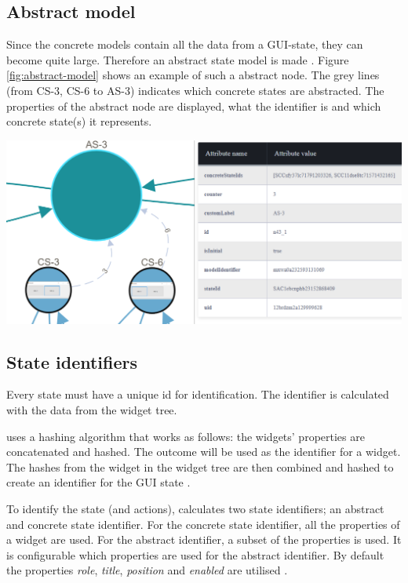 \newpage
\subsection{Abstract model} \label{abstract-model}
Since the concrete models contain all the data from a GUI-state, they can become quite large.  Therefore an abstract state model is made \cite{thesisMulders}. Figure \ref{fig:abstract-model} shows an example of such a abstract node. The grey lines (from CS-3, CS-6 to AS-3) indicates which concrete states are abstracted. The properties of the abstract node are displayed, what the identifier is and which concrete state(s) it represents.

\bigskip
\begingroup
\captionsetup{type=figure}
\includegraphics[scale=0.5]{images/abstract-model.png}
\label{fig:abstract-model}
\endgroup

\subsection{State identifiers} \label{state-identifiers}
Every state must have a unique id for identification. The identifier is calculated with the data from the widget tree. 

\testar uses a hashing algorithm that works as follows: the widgets' properties are concatenated and hashed. The outcome will be used as the identifier for a widget. The hashes from the widget in the widget tree are then combined and hashed to create an identifier for the GUI state \cite{VosAho2021}.

To identify the state (and actions), \testar calculates two state identifiers; an abstract and concrete state identifier. For the concrete state identifier, all the properties of a widget are used. For the abstract identifier, a subset of the properties is used. It is configurable which properties are used for the abstract identifier. By default the properties \textit{role}, \textit{title}, \textit{position} and \textit{enabled} are utilised \cite{VosAho2021, thesisMulders}.

